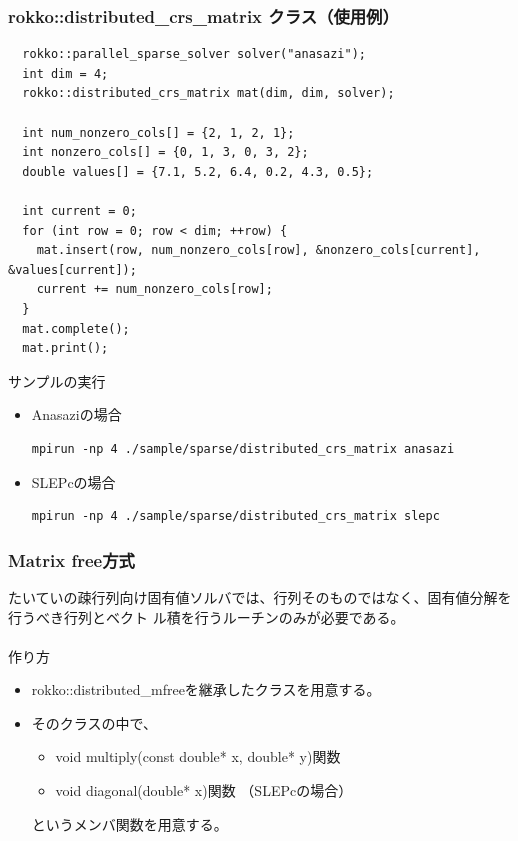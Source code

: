 \begin{frame}[c,fragile]
  \frametitle{rokko::distributed\_crs\_matrix クラス（使用例）}
\begin{lstlisting}
  rokko::parallel_sparse_solver solver("anasazi");
  int dim = 4;
  rokko::distributed_crs_matrix mat(dim, dim, solver);

  int num_nonzero_cols[] = {2, 1, 2, 1};
  int nonzero_cols[] = {0, 1, 3, 0, 3, 2};
  double values[] = {7.1, 5.2, 6.4, 0.2, 4.3, 0.5};

  int current = 0;
  for (int row = 0; row < dim; ++row) {
    mat.insert(row, num_nonzero_cols[row], &nonzero_cols[current], &values[current]);
    current += num_nonzero_cols[row]; 
  }
  mat.complete();
  mat.print();
\end{lstlisting}
\noindent
サンプルの実行
  \begin{itemize}
  \item Anasaziの場合
\begin{lstlisting}[style=shstyle]
mpirun -np 4 ./sample/sparse/distributed_crs_matrix anasazi
\end{lstlisting}
  \item SLEPcの場合
\begin{lstlisting}[style=shstyle]
mpirun -np 4 ./sample/sparse/distributed_crs_matrix slepc
\end{lstlisting}
  \end{itemize}
\end{frame}


\begin{frame}[c,fragile]
  \frametitle{Matrix free方式}
たいていの疎行列向け固有値ソルバでは、行列そのものではなく、固有値分解を行うべき行列とベクト
ル積を行うルーチンのみが必要である。
　\\
　\\
\noindent
作り方
  \begin{itemize}
  \item rokko::distributed\_mfreeを継承したクラスを用意する。
  \item そのクラスの中で、
     \begin{itemize}
     \item void multiply(const double* x, double* y)関数
     \item void diagonal(double* x)関数 （SLEPcの場合） 
     \end{itemize}
というメンバ関数を用意する。
  \end{itemize}
\end{frame}

